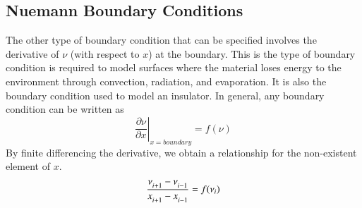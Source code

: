 \documentclass[letterpaper,12pt]{article}
\newcommand \bcf{f}
\begin{document}
\subsection{Nuemann Boundary Conditions}

The other type of boundary condition that can be specified involves the
derivative of $\nu$ (with respect to $x$) at the boundary. This is the type of
boundary condition is required to model surfaces where the material loses energy
to the environment through convection, radiation, and evaporation. It is also
the boundary condition used to model an insulator.  In general, any boundary
condition can be written as
\begin{equation}
  \label{eq:heat_flux_bc}
  \left. \frac{\partial \nu}{\partial x} \right|_{x = boundary} = \bcf(\nu)
\end{equation}
By finite differencing the derivative, we obtain a relationship for the non-existent element of $x$.
\begin{equation}
  \label{eqn:FD_BC}
  \frac{ \nu\indices{_{i+1}} - \nu\indices{_{i-1}} }{ x\indices{_{i+1}} - x\indices{_{i-1}} } = \bcf(\nu_i)
\end{equation}
\end{document}
